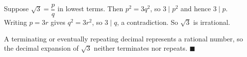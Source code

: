 Suppose $\sqrt3=\dfrac pq$ in lowest terms. Then $p^2=3q^2$, so $3\mid p^2$ and hence $3\mid p$. Writing $p=3r$ gives $q^2=3r^2$, so $3\mid q$, a contradiction. So $\sqrt3$ is irrational.

A terminating or eventually repeating decimal represents a rational number, so the decimal expansion of $\sqrt3$ neither terminates nor repeats. $\blacksquare$
